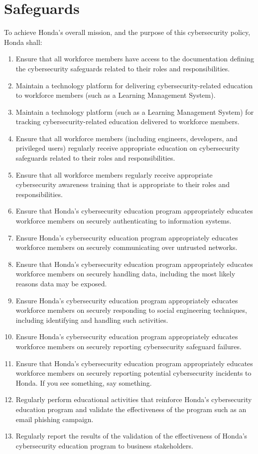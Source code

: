 \section* {Safeguards}
To achieve Honda's overall mission, and the purpose of this cybersecurity policy, Honda shall:
\begin{enumerate}
\item Ensure that all workforce members have access to the documentation defining the cybersecurity safeguards related to their roles and responsibilities.
\item Maintain a technology platform for delivering cybersecurity-related education to workforce members (such as a Learning Management System).
\item Maintain a technology platform (such as a Learning Management System) for tracking cybersecurity-related education delivered to workforce members.
\item Ensure that all workforce members (including engineers, developers, and privileged users) regularly receive appropriate education on cybersecurity safeguards related to their roles and responsibilities.
\item Ensure that all workforce members regularly receive appropriate cybersecurity awareness training that is appropriate to their roles and responsibilities.
\item Ensure that Honda's cybersecurity education program appropriately educates workforce members on securely authenticating to information systems.
\item Ensure Honda's cybersecurity education program appropriately educates workforce members on securely communicating over untrusted networks.
\item Ensure that Honda's cybersecurity education program appropriately educates workforce members on securely handling data, including the most likely reasons data may be exposed.
\item Ensure Honda's cybersecurity education program appropriately educates workforce members on securely responding to social engineering techniques, including identifying and handling such activities.
\item Ensure Honda's cybersecurity education program appropriately educates workforce members on securely reporting cybersecurity safeguard failures.
\item Ensure that Honda's cybersecurity education program appropriately educates workforce members on securely reporting potential cybersecurity incidents to Honda. If you see something, say something. 
\item Regularly perform educational activities that reinforce Honda's cybersecurity education program and validate the effectiveness of the program such as an email phishing campaign.
\item Regularly report the results of the validation of the effectiveness of Honda’s cybersecurity education program to business stakeholders.
\end{enumerate}
